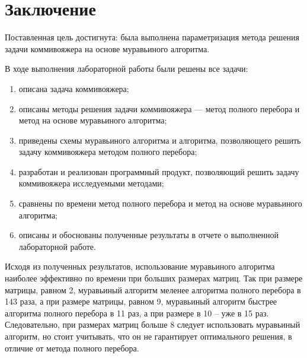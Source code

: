 \chapter*{Заключение}

Поставленная цель достигнута: была выполнена параметризация метода решения задачи коммивояжера на основе муравьиного алгоритма.

В ходе выполнения лабораторной работы были решены все задачи:

\begin{enumerate}
	\item описана задача коммивояжера;
	\item описаны методы решения задачи коммивояжера --- метод полного перебора и метод на основе муравьиного алгоритма;
	\item приведены схемы муравьиного алгоритма и алгоритма, позволяющего решить задачу коммивояжера методом полного перебора;
	\item разработан и реализован программный продукт, позволяющий решить задачу коммивояжера исследуемыми методами;
	\item сравнены по времени метод полного перебора и метод на основе муравьиного алгоритма;
	\item описаны и обоснованы полученные результаты в отчете о выполненной лабораторной работе.
\end{enumerate}

Исходя из полученных результатов, использование муравьиного алгоритма наиболее эффективно по времени при больших размерах матриц.
Так при размере матрицы, равном 2, муравьиный алгоритм меленее алгоритма полного перебора в 143 раза, а при размере матрицы, равном 9, муравьиный алгоритм быстрее алгоритма полного перебора в 11 раз, а при размере в 10 -- уже в 15 раз.
Следовательно, при размерах матриц больше 8 следует использовать муравьиный алгоритм, но стоит учитывать, что он не гарантирует оптимального решения, в отличие от метода полного перебора.